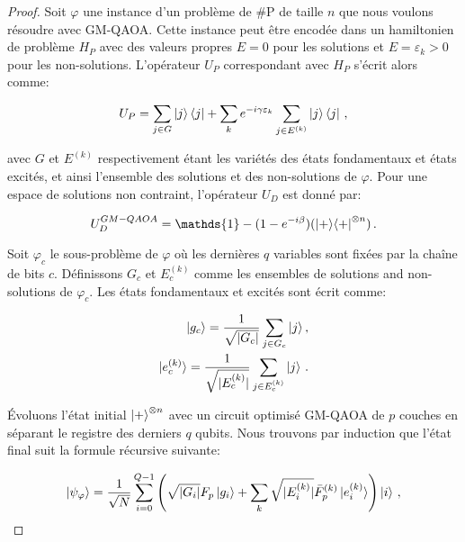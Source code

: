 \begin{proof}
    
Soit $\varphi$ une instance d'un problème de \textsf{\#P} de taille $n$ que nous voulons résoudre avec GM-QAOA. Cette instance peut être encodée dans un hamiltonien de problème $H_{P}$ avec des valeurs propres $E = 0$ pour les solutions et $E = \varepsilon_{k} > 0$ pour les non-solutions. L'opérateur $U_{P}$ correspondant avec $H_{P}$ s'écrit alors comme:

\begin{equation}
    U_{P} = \sum_{j \in G} \ket{j}\bra{j} + \sum_{k} e^{-i \gamma \varepsilon_{k}} \sum_{j \in E^{(k)}} \ket{j}\bra{j} \,,
\end{equation} 

avec $G$ et $E^{(k)}$ respectivement étant les variétés des états fondamentaux et états excités, et ainsi l'ensemble des solutions et des non-solutions de $\varphi$. Pour une espace de solutions non contraint, l'opérateur $U_{D}$ est donné par:

\begin{equation}
    U_{D}^{GM-QAOA} = \mathds{1} - (1 - e^{-i\beta}) (\ket{+}\!\bra{+}^{\otimes n}) \,.
\end{equation}

Soit $\varphi_{c}$ le sous-problème de $\varphi$ où les dernières $q$ variables sont fixées par la chaîne de bits $c$. Définissons $G_{c}$ et $E_{c}^{(k)}$ comme les ensembles de solutions and non-solutions de $\varphi_{c}$. Les états fondamentaux et excités sont écrit comme:

\begin{align}
    \ket{g_{c}} = \frac{1}{\sqrt{ \lvert G_{c} \rvert }} \sum_{j \in G_{c}} \ket{j}, \\
    \ket{e^{(k)}_{c}} = \frac{1}{\sqrt{ \lvert E^{(k)}_{c} \rvert }} \sum_{j \in E^{(k)}_{c}} \ket{j} \,.
\end{align}

Évoluons l'état initial $\ket{+}^{\otimes n}$ avec un circuit optimisé GM-QAOA de $p$ couches en séparant le registre des derniers $q$ qubits. Nous trouvons par induction que l'état final suit la formule récursive suivante:

\begin{equation}
    \label{eq:recursive-formula}
    \ket{\psi_{\varphi}} = \frac{1}{\sqrt{ N }} \sum_{i=0}^{Q-1} \left( \sqrt{ \lvert G_{i} \rvert } F_{p} \ket{g_{i}} + \sum_{k} \sqrt{ \lvert E^{(k)}_{i} \rvert } \bar{F}^{(k)}_{p} \ket{e^{(k)}_{i}} \right) \ket{i} \,,
\end{equation}


\end{proof}
